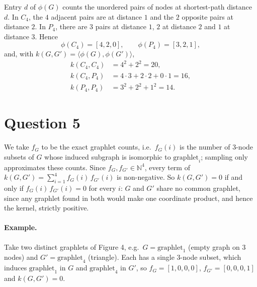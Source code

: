 \documentclass[a4paper]{article}
\begin{document}
Entry $d$ of $\phi(G)$ counts the unordered pairs of nodes at shortest-path distance $d$. In $C_4$, the $4$ adjacent pairs are at distance $1$ and the $2$ opposite pairs at distance $2$. In $P_4$, there are $3$ pairs at distance $1$, $2$ at distance $2$ and $1$ at distance $3$. Hence
\begin{equation}
    \phi(C_4) = [4, 2, 0], \qquad \phi(P_4) = [3, 2, 1],
\end{equation}
and, with $k(G,G') = \langle \phi(G), \phi(G') \rangle$,
\begin{align}
    k(C_4, C_4) &= 4^2 + 2^2 = 20, \\
    k(C_4, P_4) &= 4\cdot 3 + 2\cdot 2 + 0\cdot 1 = 16, \\
    k(P_4, P_4) &= 3^2 + 2^2 + 1^2 = 14.
\end{align}

\section{Question 5}

We take $f_G$ to be the exact graphlet counts, i.e.\ $f_G(i)$ is the number of 3-node subsets of $G$ whose induced subgraph is isomorphic to $\text{graphlet}_i$; sampling only approximates these counts. Since $f_G, f_{G'} \in \mathbb{N}^4$, every term of $k(G,G') = \sum_{i=1}^4 f_G(i)\, f_{G'}(i)$ is non-negative. So $k(G,G')=0$ if and only if $f_G(i)\,f_{G'}(i)=0$ for every $i$: $G$ and $G'$ share no common graphlet, since any graphlet found in both would make one coordinate product, and hence the kernel, strictly positive.

\paragraph{Example.} Take two distinct graphlets of Figure 4, e.g.\ $G=\text{graphlet}_1$ (empty graph on 3 nodes) and $G'=\text{graphlet}_4$ (triangle). Each has a single 3-node subset, which induces $\text{graphlet}_1$ in $G$ and $\text{graphlet}_4$ in $G'$, so $f_G=[1,0,0,0]$, $f_{G'}=[0,0,0,1]$ and $k(G,G')=0$.


% 
\end{document}

